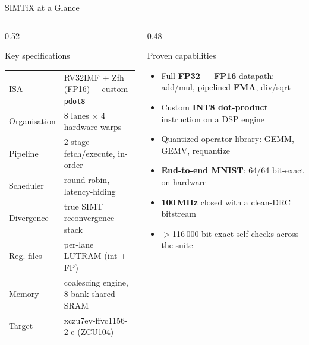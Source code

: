 \documentclass[aspectratio=169,11pt]{beamer}
\newcommand{\hl}[1]{{\color{simtixaccent}\textbf{#1}}}
\begin{document}
\begin{frame}{SIMTiX at a Glance}
  \begin{columns}[T]
    \begin{column}{0.52\textwidth}
      \begin{block}{Key specifications}
        \small
        \begin{tabular}{@{}ll@{}}
          ISA          & RV32IMF + Zfh (FP16) + custom \texttt{pdot8} \\
          Organisation & 8 lanes $\times$ 4 hardware warps \\
          Pipeline     & 2-stage fetch/execute, in-order \\
          Scheduler    & round-robin, latency-hiding \\
          Divergence   & true SIMT reconvergence stack \\
          Reg. files   & per-lane LUTRAM (int + FP) \\
          Memory       & coalescing engine, 8-bank shared SRAM \\
          Target       & xczu7ev-ffvc1156-2-e (ZCU104) \\
        \end{tabular}
      \end{block}
    \end{column}
    \begin{column}{0.48\textwidth}
      \begin{block}{Proven capabilities}
        \small
        \begin{itemize}
          \item Full \hl{FP32 + FP16} datapath: add/mul, pipelined \hl{FMA}, div/sqrt
          \item Custom \hl{INT8 dot-product} instruction on a DSP engine
          \item Quantized operator library: GEMM, GEMV, requantize
          \item \hl{End-to-end MNIST}: 64/64 bit-exact on hardware
          \item \hl{100\,MHz} closed with a clean-DRC bitstream
          \item $>$116\,000 bit-exact self-checks across the suite
        \end{itemize}
      \end{block}
    \end{column}
  \end{columns}
\end{frame}
\end{document}
